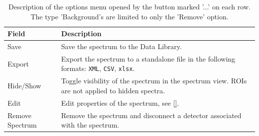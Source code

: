 \begin{table}[H]
    \centering
    \caption{Description of the options menu opened by the button marked '...' on each row. The type 'Background's are limited to only the 'Remove' option.}
    \label{tab:spectrum_info_options_menu}
    \begin{tabular}{p{}p{}}
    \toprule
    \textbf{Field} & \textbf{Description} \\ \midrule
        Save & Save the spectrum to the Data Library. \\
        Export & Export the spectrum to a standalone file in the following formats: \texttt{XML}, \texttt{CSV}, \texttt{xlsx}. \\
        Hide/Show & Toggle visibility of the spectrum in the spectrum view. ROIs are not applied to hidden spectra. \\
        Edit & Edit properties of the spectrum, see \autoref{}. \\
        Remove Spectrum & Remove the spectrum and disconnect a detector associated with the spectrum.
    \\ \bottomrule
    \end{tabular}
\end{table}